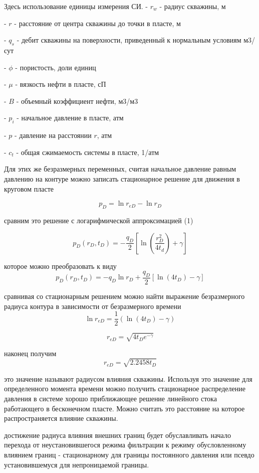 Здесь использование единицы измерения СИ.
- $r_w$ - радиус скважины, м

- $r$ - расстояние от центра скважины до точки в пласте, м

- $q_s$ - дебит скважины на поверхности, приведенный к нормальным условиям м3/сут

- $\phi$ - пористость, доли единиц

- $\mu$ - вязкость нефти в пласте, сП

- $B$ - объемный коэффициент нефти, м3/м3

- $p_i$ - начальное давление в пласте, атм

- $p$ - давление на расстоянии $r$, атм

- $c_t$ - общая сжимаемость системы в пласте, 1/атм

Для этих же безразмерных переменных, считая начальное давление равным давлению на контуре можно записать стационарное решение для движения в круговом пласте

$$p_D = \ln r_{eD} - \ln r_D $$

сравним это решение с логарифмической аппроксимацией (1)

$$p_D(r_D,t_D) = - \frac{q_D}{2} \left[ \ln \left( \dfrac{ r_D^2}{4t_d} \right) +\gamma \right] $$

которое можно преобразовать к виду
$$p_D(r_D,t_D) = - q_D \ln r_D  + \frac{q_D}{2} \left[ \ln(4t_D)   -\gamma \right] $$

сравнивая со стационарным решением можно найти выражение безразмерного радиуса контура в зависимости от безразмерного времени
$$\ln r_{eD} = \frac{1}{2}(\ln(4t_D)-\gamma) $$

$$r_{eD} =  \sqrt { 4t_D e^{-\gamma} }  $$

наконец получим
$$r_{eD} = \sqrt {2.2458 t_D} $$

это значение называют радиусом влияния скважины. Используя это значение для определенного момента времени можно получить стационарное распределение давления в системе хорошо приближающее решение линейного стока работающего в бесконечном пласте. Можно считать это расстояние на которое распространяется влияние скважины.

достижение радиуса влияния внешних границ будет обуславливать начало перехода от неустановившегося режима фильтрации к режиму обусловленному влиянием границ - стационарному для границы постоянного давления или псевдо установившемуся для непроницаемой границы.

